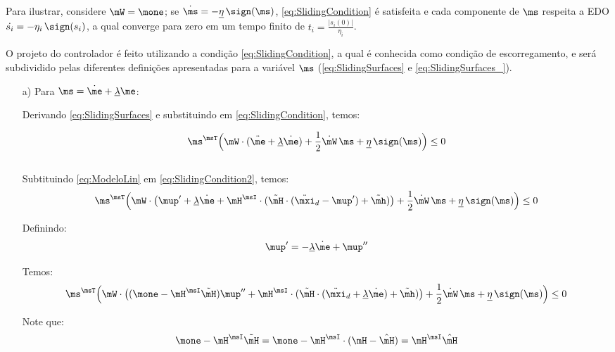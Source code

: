 \documentclass[]{politex}
\begin{document}
Para ilustrar, considere $\mW = \mone$; se $\dot{\ms} = - \underline{\eta} \,\sign(\ms)$,  \eqref{eq:SlidingCondition} \'e satisfeita e cada componente de $\ms$ respeita a EDO $\dot{s_i} = - \eta_i \,\sign(s_i)$, a qual converge para zero em um tempo finito de $t_i = \frac{|s_i(0)|}{\eta_i}$.

O projeto do controlador \'e feito utilizando a condi\c{c}\~ao \eqref{eq:SlidingCondition}, a qual \'e conhecida como condi\c{c}\~ao de escorregamento, e será subdividido pelas diferentes definições apresentadas para a variável $\ms$ (\eqref{eq:SlidingSurfaces} e \eqref{eq:SlidingSurfaces_}).

\begin{itemize}
\item[a)] Para $\ms = \dot{\me} + \underline{\lambda}\me$:

Derivando \eqref{eq:SlidingSurfaces} e substituindo em \eqref{eq:SlidingCondition}, temos:

\begin{equation} \label{eq:SlidingCondition2}
\ms^\msT \Big(\mW \cdot (\ddot{\me} + \underline{\lambda} \dot{\me} ) + \frac{1}{2}\dot{\mW} \, \ms + \underline{\eta} \, \sign(\ms) \Big) \leq 0
\end{equation} \\



Subtituindo \eqref{eq:ModeloLin} em \eqref{eq:SlidingCondition2}, temos:
\begin{equation} \label{eq:SlidingCondition3}
\ms^\msT \Big(\mW \cdot \big(\mup' + \underline{\lambda} \dot{\me} + \mH^\msI \cdot ( \tilde{\mH} \cdot (\ddot{\mxi}_d - \mup') + \tilde{\mh} ) \big) + \frac{1}{2}\dot{\mW} \, \ms + \underline{\eta} \, \sign(\ms) \Big) \leq 0
\end{equation}

Definindo:
\begin{equation}
\mup' = - \underline{\lambda} \dot{\me} + \mup''
\end{equation}

Temos:
\begin{equation} \label{eq:SlidingCondition3_}
\ms^\msT \Big(\mW \cdot \big( (\mone - \mH^\msI \tilde{\mH} )\mup'' + \mH^\msI \cdot ( \tilde{\mH}\cdot (\ddot{\mxi}_d + \underline{\lambda} \dot{\me}) + \tilde{\mh} ) \big) + \frac{1}{2}\dot{\mW} \, \ms + \underline{\eta} \, \sign(\ms) \Big) \leq 0
\end{equation}

Note que:
\begin{equation}
\mone - \mH^\msI \tilde{\mH} = \mone - \mH^\msI \cdot ( \mH - \hat{\mH}) = \mH^\msI \hat{\mH}
\end{equation}


\end{itemize}
\end{document}
